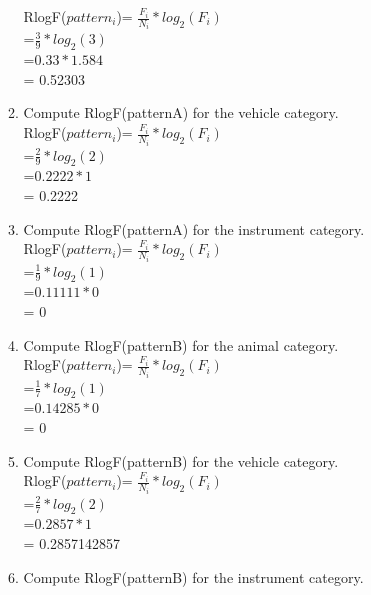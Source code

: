 \documentclass[11pt]{article}
\begin{document}
\begin{enumerate}
\begin{enumerate}
RlogF($pattern_i$)= $\frac{F_i}{N_i} * log_2 (F_i)$\\
			    =$\frac{3}{9} * log_2(3)$\\
			    =$ 0.33 * 1.584 $ \\
			    = 0.52303\\	

\item Compute RlogF(patternA) for the {\sc vehicle} category. \\


RlogF($pattern_i$)= $\frac{F_i}{N_i} * log_2 (F_i)$\\
			    =$\frac{2}{9} * log_2(2)$\\
			    =$ 0.2222 * 1 $ \\
			    = 0.2222\\	

\item Compute RlogF(patternA) for the {\sc instrument} category. \\


RlogF($pattern_i$)= $\frac{F_i}{N_i} * log_2 (F_i)$\\
			    =$\frac{1}{9} * log_2(1)$\\
			    =$ 0.11111 * 0$ \\
			    = 0\\	


\item Compute RlogF(patternB) for the {\sc animal} category. \\


RlogF($pattern_i$)= $\frac{F_i}{N_i} * log_2 (F_i)$\\
			    =$\frac{1}{7} * log_2(1)$\\
			    =$ 0.14285 * 0 $ \\
			    = 0\\	

\item Compute RlogF(patternB) for the {\sc vehicle} category. \\


RlogF($pattern_i$)= $\frac{F_i}{N_i} * log_2 (F_i)$\\
			    =$\frac{2}{7} * log_2(2)$\\
			    =$ 0.2857 * 1 $ \\
			    = 0.2857142857\\	

\item Compute RlogF(patternB) for the {\sc instrument} category. \\



\end{enumerate}
\end{enumerate}
\end{document}
